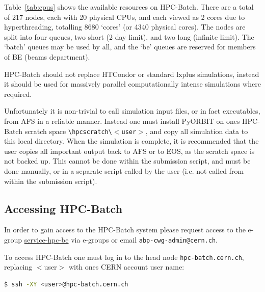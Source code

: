\documentclass[a4paper]{cernatsnote}
\def \headnode {\texttt{hpc-batch.cern.ch}}
\begin{document}
Table~\ref{tab:cpus} shows the available resources on HPC-Batch. There are a total of 217 nodes, each with 20 physical CPUs, and each viewed as 2 cores due to hyperthreading, totalling 8680 `cores' (or 4340 physical cores). The nodes are split into four queues, two short (2 day limit), and two long (infinite limit). The `batch' queues may be used by all, and the `be' queues are reserved for members of BE (beams department).

HPC-Batch should not replace HTCondor or standard lxplus simulations, instead it should be used for massively parallel computationally intense simulations where required.

Unfortunately it is non-trivial to call simulation input files, or in fact executables, from AFS in a reliable manner. Instead one must install PyORBIT on ones HPC-Batch scratch space \texttt{\textbackslash hpcscratch\textbackslash $<$user$>$}, and copy all simulation data to this local directory. When the simulation is complete, it is recommended that the user copies all important output back to AFS or to EOS, as the scratch space is not backed up. This cannot be done within the submission script, and must be done manually, or in a separate script called by the user (i.e. not called from within the submission script).

\subsection{Accessing HPC-Batch}
\label{sec:access}

In order to gain access to the HPC-Batch system please request access to the e-group \href{https://e-groups.cern.ch/e-groups/Egroup.do?egroupId=10245625&AI_USERNAME=HARAFIQU&searchField=0&searchMethod=0&searchValue=service-hpc-be&pageSize=30&hideSearchFields=false&searchMemberOnly=false&searchAdminOnly=false&AI_SESSION=lKFyHz8s-iVcgi9UtzwK-aBtk4OSxot37tlEfn8KCeHPzfMElLZd!393472965!1522333073243}{service-hpc-be} via e-groups or email \texttt{abp-cwg-admin@cern.ch}.

To access HPC-Batch one must log in to the head node \headnode, replacing $<$user$>$ with ones CERN account user name:

\begin{lstlisting}[language=bash, belowskip=-3\medskipamount]
$ ssh -XY <user>@hpc-batch.cern.ch
\end{lstlisting}
\end{document}
